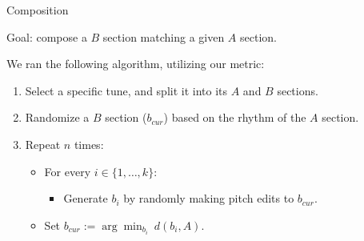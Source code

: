 \documentclass[letterpaper]{amsart}
\begin{document}
\begin{center}
\Huge
Composition
\end{center}
\huge
Goal: compose a $B$ section matching a given $A$ section.

We ran the following algorithm, utilizing our metric:
\begin{enumerate}[1.]\parskip=0.05in
\item Select a specific tune, and split it into its $A$ and $B$ sections.

\item Randomize a $B$ section ($b_{cur}$) based on the rhythm of the $A$
section.

\item Repeat $n$ times:
\begin{itemize}\parskip=0.05in
\item[] For every $i \in \{1, \dots, k\}$:
\begin{itemize}
\item[] Generate $b_i$ by randomly making pitch edits to $b_{cur}$.
\end{itemize}
\item[] Set
$\displaystyle{b_{cur} := \arg \min_{b_i} \  d(b_i, A)}$.
\end{itemize}
\end{enumerate}


\end{document}
